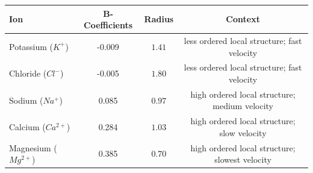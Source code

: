 \documentclass[11pt]{article}
\begin{document}
\begin{tcolorbox}[colback=cyan!5,colframe=cyan!50!black,title=Game Mechanic: Ion Velocity Scaling]
	\centering
	{\small
    \label{tab:ions}
	\begin{tabular}{l|c|c|c}
		\toprule
		\textbf{Ion} & \textbf{B-Coefficients} & \textbf{Radius} & \textbf{Context} \\
		\midrule
		Potassium ($K^+$)     & -0.009 & $1.41$ & less ordered local structure; fast velocity \\
		Chloride  ($Cl^-$)    & -0.005 & $1.80$ & less ordered local structure; fast velocity \\
		Sodium    ($Na^+$)    & 0.085  & $0.97$ & high ordered local structure; medium velocity \\
		Calcium   ($Ca^{2+}$) & 0.284  & $1.03$ & high ordered local structure; slow velocity \\
		Magnesium ($Mg^{2+}$) & 0.385  & $0.70$ & high ordered local structure; slowest velocity \\
		\bottomrule
	\end{tabular}
	}
\end{tcolorbox}
\end{document}
